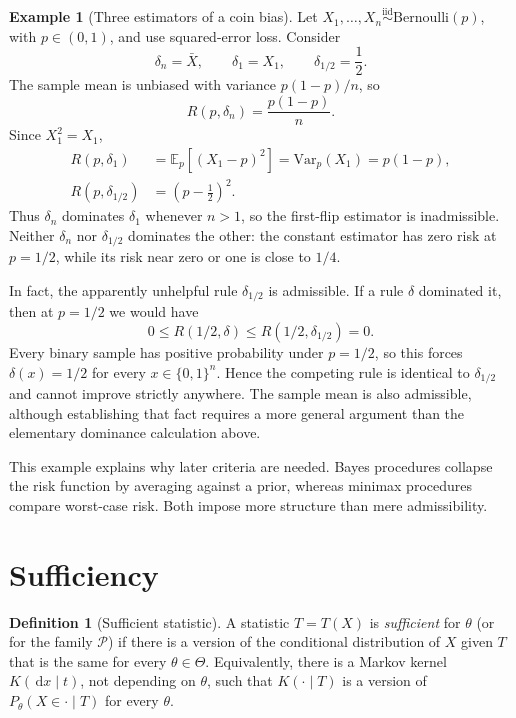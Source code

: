\documentclass[12pt,oneside]{book}
\numberwithin{equation}{section}
\theoremstyle{definition}
\newtheorem{definition}{Definition}[section]
\newtheorem{example}{Example}[section]
\theoremstyle{plain}
\theoremstyle{remark}
\newcommand{\E}{\mathbb{E}}
\newcommand{\Var}{\mathrm{Var}}
\newcommand{\iid}{\overset{\text{iid}}{\sim}}
\newcommand{\dd}{\,\mathrm{d}}
\newcommand{\Bern}{\mathrm{Bernoulli}}
\begin{document}
\begin{example}[Three estimators of a coin bias]
Let $X_1,\ldots,X_n\iid\Bern(p)$, with $p\in(0,1)$, and use squared-error
loss. Consider
\[
 \delta_n=\bar X,
 \qquad \delta_1=X_1,
 \qquad \delta_{1/2}=\frac12.
\]
The sample mean is unbiased with variance $p(1-p)/n$, so
\[
 R(p,\delta_n)=\frac{p(1-p)}{n}.
\]
Since $X_1^2=X_1$,
\begin{align*}
 R(p,\delta_1)
 &=\E_p[(X_1-p)^2]
 =\Var_p(X_1)=p(1-p),\\
 R(p,\delta_{1/2})&=\left(p-\frac12\right)^2.
\end{align*}
Thus $\delta_n$ dominates $\delta_1$ whenever $n>1$, so the first-flip
estimator is inadmissible. Neither $\delta_n$ nor $\delta_{1/2}$ dominates
the other: the constant estimator has zero risk at $p=1/2$, while its risk
near zero or one is close to $1/4$.

In fact, the apparently unhelpful rule $\delta_{1/2}$ is admissible. If a
rule $\delta$ dominated it, then at $p=1/2$ we would have
\[
 0\leq R(1/2,\delta)\leq R(1/2,\delta_{1/2})=0.
\]
Every binary sample has positive probability under $p=1/2$, so this forces
$\delta(x)=1/2$ for every $x\in\{0,1\}^n$. Hence the competing rule is
identical to $\delta_{1/2}$ and cannot improve strictly anywhere. The sample
mean is also admissible, although establishing that fact requires a more
general argument than the elementary dominance calculation above.
\end{example}

This example explains why later criteria are needed. Bayes procedures
collapse the risk function by averaging against a prior, whereas minimax
procedures compare worst-case risk. Both impose more structure than mere
admissibility.

\section{Sufficiency}

\begin{definition}[Sufficient statistic]
A statistic $T=T(X)$ is \emph{sufficient} for $\theta$ (or for the family
$\mathcal P$) if there is a version of the conditional distribution of $X$
given $T$ that is the same for every $\theta\in\Theta$.  Equivalently, there
is a Markov kernel $K(\dd x\mid t)$, not depending on $\theta$, such that
$K(\cdot\mid T)$ is a version of $P_\theta(X\in\cdot\mid T)$ for every
$\theta$.
\end{definition}
\end{document}
